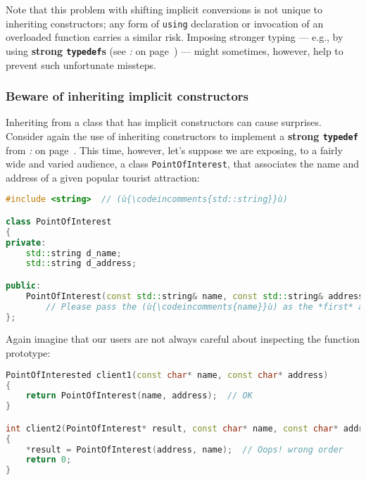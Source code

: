 Note that this problem with shifting implicit conversions is not unique
to inheriting constructors; any form of \texttt{using} declaration or
invocation of an overloaded function carries a similar risk. Imposing
stronger typing --- e.g., by using \textbf{strong \texttt{typedef}s} (see \textit{: } on page~\pageref{implementing-a-strong-typedef}) --- might sometimes, however, help to prevent such
unfortunate missteps.

\subsubsection[Beware of inheriting implicit constructors]{Beware of inheriting implicit constructors}\label{beware-of-inheriting-implicit-constructors}

Inheriting from a class that has implicit constructors can cause
surprises. Consider again the use of inheriting constructors to
implement a \textbf{strong \texttt{typedef}} from \textit{: } on page~\pageref{implementing-a-strong-typedef}. This time, however, let's suppose we are
exposing, to a fairly wide and varied audience, a class
\texttt{PointOfInterest}, that associates the name and address of a
given popular tourist attraction:

\begin{lstlisting}[language=C++]
#include <string>  // (ù{\codeincomments{std::string}}ù)

class PointOfInterest
{
private:
    std::string d_name;
    std::string d_address;

public:
    PointOfInterest(const std::string& name, const std::string& address);
        // Please pass the (ù{\codeincomments{name}}ù) as the *first* and the (ù{\codeincomments{address}}ù) *second*!
};
\end{lstlisting}
    
\noindent Again imagine that our users are not always careful about inspecting the
function prototype:

\begin{lstlisting}[language=C++]
PointOfInterested client1(const char* name, const char* address)
{
    return PointOfInterest(name, address);  // OK
}

int client2(PointOfInterest* result, const char* name, const char* address)
{
    *result = PointOfInterest(address, name);  // Oops! wrong order
    return 0;
}
\end{lstlisting}
    
